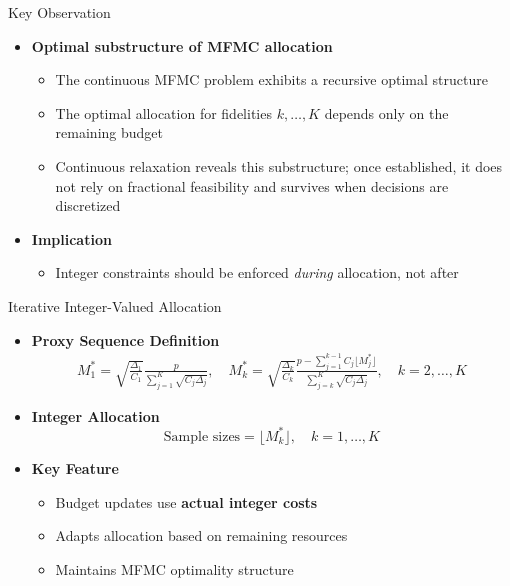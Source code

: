 \documentclass{beamer}
\begin{document}
\begin{frame}{Key Observation}
\begin{itemize}[leftmargin=5pt] 
\item \textcolor{myblue3}{\bf Optimal substructure of MFMC allocation}
\begin{itemize}[leftmargin=15pt] 
\item[$\circ$] The continuous MFMC problem exhibits a recursive optimal structure
\item[$\circ$] The optimal allocation for fidelities $k,\dots,K$ depends only on the remaining budget
\item[$\circ$] Continuous relaxation reveals this substructure; once established, it does not rely on fractional feasibility and survives when decisions are discretized
\end{itemize}

\item \textcolor{myred}{\bf Implication}
\begin{itemize}[leftmargin=15pt] 
\item[$\circ$] Integer constraints should be enforced \emph{during} allocation, not after
\end{itemize}
\end{itemize}
\end{frame}


\begin{frame}{Iterative Integer-Valued Allocation}
\begin{itemize}[leftmargin=5pt] 
\item[$\triangleright$] \textcolor{myblue3}{\bf Proxy Sequence Definition}
{\footnotesize
\begin{align*}
M_1^* = \sqrt{\frac{\Delta_1}{C_1}} \frac{p}{\sum_{j=1}^K \sqrt{C_j \Delta_j}}, \quad 
M_k^* = \sqrt{\frac{\Delta_k}{C_k}} \frac{p - \sum_{j=1}^{k-1} C_j \lfloor M_j^* \rfloor}{\sum_{j=k}^K \sqrt{C_j \Delta_j}}, \quad k = 2,\ldots,K
\end{align*}
}

\item[$\triangleright$] \textcolor{myblue3}{\bf Integer Allocation}
{\footnotesize
\[
\text{Sample sizes} = \lfloor M_k^* \rfloor, \quad k = 1,\ldots,K
\]
}

\item[$\triangleright$] \textcolor{myblue3}{\bf Key Feature}
{\footnotesize
\begin{itemize}[leftmargin=15pt] 
\item[$\circ$] Budget updates use \textbf{actual integer costs}
\item[$\circ$] Adapts allocation based on remaining resources
\item[$\circ$] Maintains MFMC optimality structure
\end{itemize}
}
\end{itemize}
\end{frame}
\end{document}
